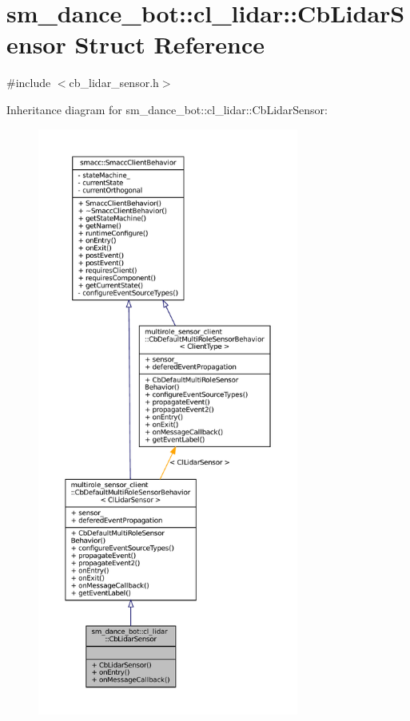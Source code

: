 \hypertarget{structsm__dance__bot_1_1cl__lidar_1_1CbLidarSensor}{}\section{sm\+\_\+dance\+\_\+bot\+:\+:cl\+\_\+lidar\+:\+:Cb\+Lidar\+Sensor Struct Reference}
\label{structsm__dance__bot_1_1cl__lidar_1_1CbLidarSensor}


{\ttfamily \#include $<$cb\+\_\+lidar\+\_\+sensor.\+h$>$}



Inheritance diagram for sm\+\_\+dance\+\_\+bot\+:\+:cl\+\_\+lidar\+:\+:Cb\+Lidar\+Sensor\+:
\nopagebreak
\begin{figure}[H]
\begin{center}
\leavevmode
\includegraphics[height=550pt]{structsm__dance__bot_1_1cl__lidar_1_1CbLidarSensor__inherit__graph}
\end{center}
\end{figure}


